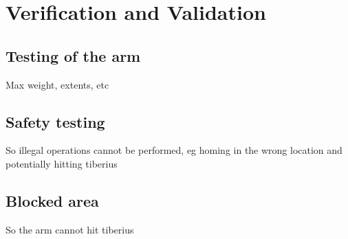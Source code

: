 \section{Verification and Validation}
\subsection{Testing of the arm}
Max weight, extents, etc
\subsection{Safety testing}
So illegal operations cannot be performed, eg homing in the wrong location and potentially hitting tiberius
\subsection{Blocked area}
So the arm cannot hit tiberius
